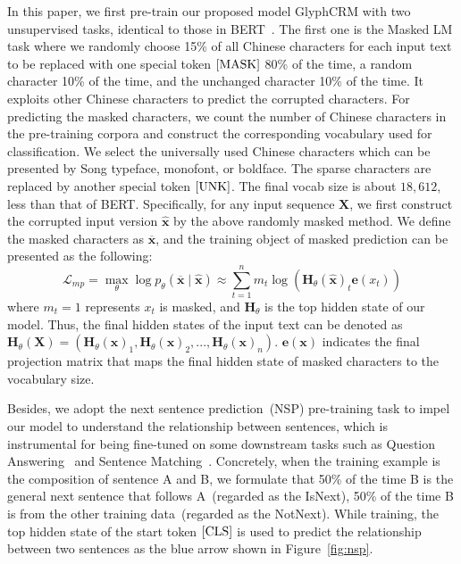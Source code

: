 In this paper, we first pre-train our proposed model GlyphCRM with two unsupervised tasks, identical to those in BERT~\cite{devlin-etal-2019-bert}. The first one is the Masked LM task where we randomly choose 15\% of all Chinese characters for each input text to be replaced with one special token $\rm[MASK]$ 80\% of the time, a random character 10\% of the time, and the unchanged character 10\% of the time. It exploits other Chinese characters to predict the corrupted characters. For predicting the masked characters, we count the number of Chinese characters in the pre-training corpora and construct the corresponding vocabulary used for classification. 
We select the universally used Chinese characters which can be presented by Song typeface, monofont, or boldface. The sparse characters are replaced by another special token $\rm[UNK]$. The final vocab size is about $18,612$, less than that of BERT.
Specifically, for any input sequence $\mathbf{X}$, we first construct the corrupted input version $\hat{\mathbf{x}}$ by the above randomly masked method. We define the masked characters as $\overline{\mathbf{x}}$, and the training object of masked prediction can be presented as the following:
\begin{equation}
\mathcal{L}_{mp} = \max _{\theta} \log p_{\theta}(\overline{\mathbf{x}} \mid \hat{\mathbf{x}}) \approx \sum_{t=1}^{n} m_{t} \log \left(\mathbf{H}_{\theta}(\hat{\mathbf{x}})_{t} \mathbf{e}\left(x_{t}\right)\right)
\label{eq5}
\end{equation}
where $m_{t} = 1$ represents $x_{t}$ is masked, and $\mathbf{H}_{\theta}$ is the top hidden state of our model. Thus, the final hidden states of the input text can be denoted as $\mathbf{H}_{\theta}(\mathbf{X}) = (\mathbf{H}_{\theta}(\mathbf{x})_{1}, \mathbf{H}_{\theta}(\mathbf{x})_{2}, ..., \mathbf{H}_{\theta}(\mathbf{x})_{n})$. $\mathbf{e(x)}$ indicates the final projection matrix that maps the final hidden state of masked characters to the vocabulary size.     



Besides, we adopt the next sentence prediction~(NSP) pre-training task to impel our model to understand the relationship between sentences, which is instrumental for being fine-tuned on some downstream tasks such as Question Answering~\cite{questiona2, wang-etal-2017-questiona} and Sentence Matching~\cite{sentence_m, NIPS2014_hu}. Concretely, when the training example is the composition of sentence A and B, we formulate that 50\% of the time B is the general next sentence that follows A~(regarded as the IsNext), 50\% of the time B is from the other training data~(regarded as the NotNext). While training, the top hidden state of the start token $\rm[CLS]$ is used to predict the relationship between two sentences as the blue arrow shown in Figure~\ref{fig:nsp}.



